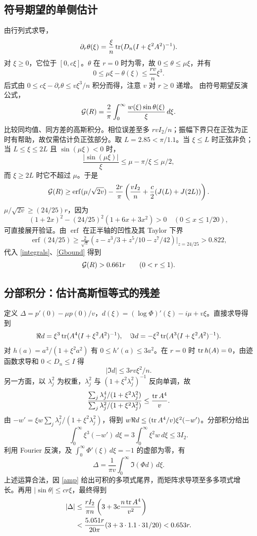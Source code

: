 \documentclass[11pt,a4paper,fontset=fandol]{ctexart}
\begin{document}
\subsection{符号期望的单侧估计}
由行列式求导，
\[\partial_r\theta(\xi)=\frac{\xi}{n}\operatorname{tr}(D_n(I+\xi^2A^2)^{-1}).\]
对 $\xi\ge0$，它位于 $[0,c\xi]$。$\theta$ 在 $r=0$ 时为零，故 $0\le\theta\le\mu\xi$，并有
\[0\le\mu\xi-\theta(\xi)\le\frac{rv}{n}\xi^3.\]
后式由 $0\le c\xi-\partial_r\theta\le v\xi^3/n$ 积分而得，注意 $v$ 对 $r\ge0$ 递增。
由符号期望反演公式，
\[\mathcal G(R)=\frac2\pi\int_0^\infty\frac{w(\xi)\sin\theta(\xi)}\xi\,d\xi.\]
比较同均值、同方差的高斯积分。相位误差至多 $rvI_2/n$；振幅下界只在正弦为正时有帮助，故仅需估计负正弦部分。取 $L=2.85<\pi/1.1$。当 $\xi\le L$ 时正弦非负；当 $L\le\xi\le2L$ 且 $\sin(\mu\xi)<0$ 时，
\[\frac{|\sin(\mu\xi)|}{\xi}\le\mu-\pi/\xi\le\mu/2,\]
而 $\xi\ge2L$ 时它不超过 $\mu$。于是
\begin{equation}\label{Gbound}
\mathcal G(R)\ge\operatorname{erf}(\mu/\sqrt{2v})-
\frac{2r}\pi\left(\frac{vI_2}{n}+\frac c2(J(L)+J(2L))\right).
\end{equation}
$\mu/\sqrt{2v}\ge(24/25)r$，因为
\[(1+2x)^2-(24/25)^2(1+6x+3x^2)>0\quad (0\le x\le1/20),\]
可直接展开验证。由 $\operatorname{erf}$ 在正半轴的凹性及其 Taylor 下界
\[\operatorname{erf}(24/25)\ge\tfrac2{\sqrt\pi}(z-z^3/3+z^5/10-z^7/42)\big|_{z=24/25}>0.822,\]
代入 \eqref{integrals}、\eqref{Gbound} 得到
\begin{equation}\label{Gpositive}
\mathcal G(R)>0.661r\qquad(0<r\le1).
\end{equation}
\subsection{分部积分：估计高斯恒等式的残差}
定义 $\Delta=p'(0)-\mu p(0)/v$，$d(\xi)=(\log\Phi)'(\xi)-i\mu+v\xi$。直接求导得到
\[\Re d=\xi^3\operatorname{tr}(A^4(I+\xi^2A^2)^{-1}),\quad \Im d=-\xi^2\operatorname{tr}(A^3(I+\xi^2A^2)^{-1}).\]
对 $h(a)=a^3/(1+\xi^2a^2)$ 有 $0\le h'(a)\le3a^2$。在 $r=0$ 时 $\operatorname{tr} h(A)=0$，由迹函数求导和 $0<D_n\le I$ 得
\[|\Im d|\le3rv\xi^2/n.\]
另一方面，以 $\lambda_j^2$ 为权重，$\lambda_j^2$ 与 $(1+\xi^2\lambda_j^2)^{-1}$ 反向单调，故
\[\frac{\sum_j\lambda_j^4/(1+\xi^2\lambda_j^2)}{\sum_j\lambda_j^2/(1+\xi^2\lambda_j^2)}\le\frac{\operatorname{tr} A^4}{v}.\]
由 $-w'=\xi w\sum_j\lambda_j^2/(1+\xi^2\lambda_j^2)$，得到 $w\Re d\le(\operatorname{tr} A^4/v)\xi^2(-w')$。分部积分给出
\[\int_0^\infty\xi^3(-w')\,d\xi=3\int_0^\infty\xi^2w\,d\xi\le3I_2.\]
利用 Fourier 反演，及 $\int_0^\infty\Phi'(\xi)\,d\xi=-1$ 的虚部为零，有
\[\Delta=\frac1{\pi v}\int_0^\infty\Im(\Phi d)\,d\xi.\]
上述运算合法，因 \eqref{amp} 给出可积的多项式尾界，而矩阵求导项至多多项式增长。再用 $|\sin\theta|\le cr\xi$，最终得到
\begin{align}
|\Delta|&\le\frac{rI_2}{\pi n}\left(3+3c\frac{n\operatorname{tr} A^4}{v^2}\right)\notag\\
&<\frac{5.051r}{20\pi}(3+3\cdot1.1\cdot31/20)<0.653r.\label{Delta}
\end{align}
\end{document}
